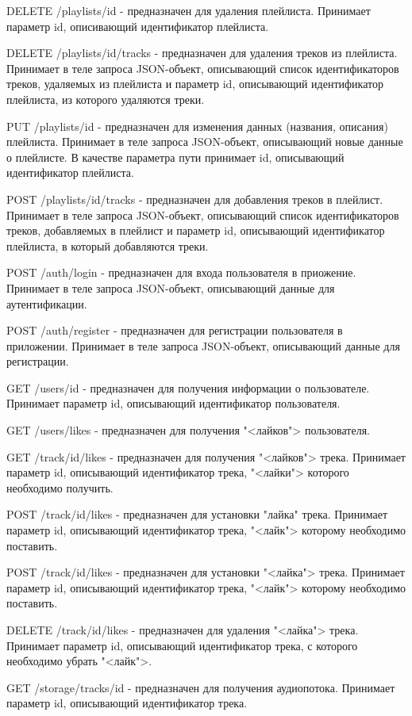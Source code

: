 DELETE /playlists/{id} - предназначен для удаления плейлиста. Принимает параметр id, описивающий идентификатор плейлиста.

DELETE /playlists/{id}/tracks - предназначен для удаления треков из плейлиста. Принимает в теле запроса JSON-объект, описывающий список идентификаторов треков, удаляемых из плейлиста и параметр id, описывающий идентификатор плейлиста, из которого удаляются треки. 

PUT /playlists/{id} - предназначен для изменения данных (названия, описания) плейлиста. Принимает в теле запроса JSON-объект, описывающий новые данные о плейлисте. В качестве параметра пути принимает id, описывающий идентификатор плейлиста.

POST /playlists/{id}/tracks - предназначен для добавления треков в плейлист. Принимает в теле запроса JSON-объект, описывающий список идентификаторов треков, добавляемых в плейлист и параметр id, описывающий идентификатор плейлиста, в который добавляются треки. 

POST /auth/login - предназначен для входа пользователя в приожение. Принимает в теле запроса JSON-объект, описывающий данные для аутентификации.

POST /auth/register - предназначен для регистрации пользователя в приложении.  Принимает в теле запроса JSON-объект, описывающий данные для регистрации.

GET /users/{id} - предназначен для получения информации о пользователе. Принимает параметр id, описывающий идентификатор пользователя.

GET /users/likes - предназначен для получения "<лайков"> пользователя.

GET /track/{id}/likes - предназначен для получения "<лайков"> трека. Принимает параметр id, описывающий идентификатор трека, "<лайки"> которого необходимо получить.

POST /track/{id}/likes - предназначен для установки "лайка" трека. Принимает параметр id, описывающий идентификатор трека, "<лайк"> которому необходимо поставить.

POST /track/{id}/likes - предназначен для установки "<лайка"> трека. Принимает параметр id, описывающий идентификатор трека, "<лайк"> которому необходимо поставить.

DELETE /track/{id}/likes - предназначен для удаления "<лайка"> трека. Принимает параметр id, описывающий идентификатор трека, с которого необходимо убрать "<лайк">.

GET /storage/tracks/{id} - предназначен для получения аудиопотока. Принимает параметр id, описывающий идентификатор трека.

